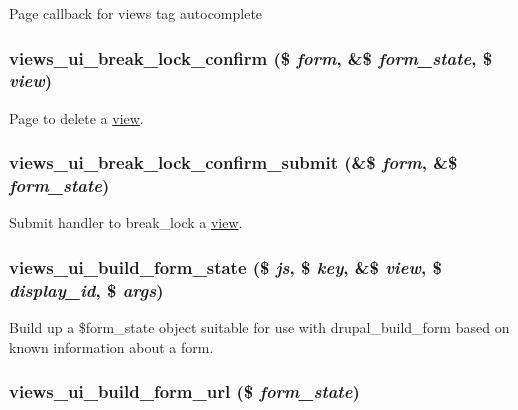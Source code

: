 \label{admin_8inc_a1a3a91dbf973532f39cee36c1d99c87b}
Page callback for views tag autocomplete \hypertarget{admin_8inc_ab3dce1eb9283a346676043461ef544cc}{
\subsubsection[{views\_\-ui\_\-break\_\-lock\_\-confirm}]{\setlength{\rightskip}{0pt plus 5cm}views\_\-ui\_\-break\_\-lock\_\-confirm (\$ {\em form}, \/  \&\$ {\em form\_\-state}, \/  \$ {\em view})}}
\label{admin_8inc_ab3dce1eb9283a346676043461ef544cc}
Page to delete a \hyperlink{classview}{view}. \hypertarget{admin_8inc_ac4e4cf7b38cbca3119949d164226ab93}{
\subsubsection[{views\_\-ui\_\-break\_\-lock\_\-confirm\_\-submit}]{\setlength{\rightskip}{0pt plus 5cm}views\_\-ui\_\-break\_\-lock\_\-confirm\_\-submit (\&\$ {\em form}, \/  \&\$ {\em form\_\-state})}}
\label{admin_8inc_ac4e4cf7b38cbca3119949d164226ab93}
Submit handler to break\_\-lock a \hyperlink{classview}{view}. \hypertarget{admin_8inc_afc1eec863da7b425bae3b0509fe17e4d}{
\subsubsection[{views\_\-ui\_\-build\_\-form\_\-state}]{\setlength{\rightskip}{0pt plus 5cm}views\_\-ui\_\-build\_\-form\_\-state (\$ {\em js}, \/  \$ {\em key}, \/  \&\$ {\em view}, \/  \$ {\em display\_\-id}, \/  \$ {\em args})}}
\label{admin_8inc_afc1eec863da7b425bae3b0509fe17e4d}
Build up a \$form\_\-state object suitable for use with drupal\_\-build\_\-form based on known information about a form. \hypertarget{admin_8inc_a89ecd86607b4c1d1928120aaa1004c0d}{
\subsubsection[{views\_\-ui\_\-build\_\-form\_\-url}]{\setlength{\rightskip}{0pt plus 5cm}views\_\-ui\_\-build\_\-form\_\-url (\$ {\em form\_\-state})}}
